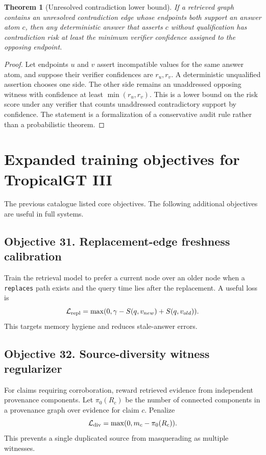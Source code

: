 \documentclass[11pt]{article}
\newtheorem{theorem}{Theorem}[section]
\theoremstyle{definition}
\theoremstyle{remark}
\begin{document}
\begin{theorem}[Unresolved contradiction lower bound]
If a retrieved graph contains an unresolved contradiction edge whose endpoints both support an answer atom \(c\), then any deterministic answer that asserts \(c\) without qualification has contradiction risk at least the minimum verifier confidence assigned to the opposing endpoint.
\end{theorem}
\begin{proof}
Let endpoints \(u\) and \(v\) assert incompatible values for the same answer atom, and suppose their verifier confidences are \(r_u,r_v\). A deterministic unqualified assertion chooses one side. The other side remains an unaddressed opposing witness with confidence at least \(\min(r_u,r_v)\). This is a lower bound on the risk score under any verifier that counts unaddressed contradictory support by confidence. The statement is a formalization of a conservative audit rule rather than a probabilistic theorem.
\end{proof}

\section{Expanded training objectives for TropicalGT III}

The previous catalogue listed core objectives. The following additional objectives are useful in full systems.

\subsection{Objective 31. Replacement-edge freshness calibration}
Train the retrieval model to prefer a current node over an older node when a \texttt{replaces} path exists and the query time lies after the replacement. A useful loss is
\[
    \mathcal L_{\rm repl}=\max(0,\gamma-S(q,v_{new})+S(q,v_{old})).
\]
This targets memory hygiene and reduces stale-answer errors.

\subsection{Objective 32. Source-diversity witness regularizer}
For claims requiring corroboration, reward retrieved evidence from independent provenance components. Let \(\pi_0(R_c)\) be the number of connected components in a provenance graph over evidence for claim \(c\). Penalize
\[
    \mathcal L_{\rm div}=\max(0,m_c-\pi_0(R_c)).
\]
This prevents a single duplicated source from masquerading as multiple witnesses.
\end{document}
